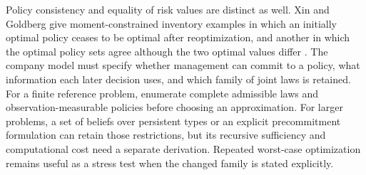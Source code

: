 Policy consistency and equality of risk values are distinct as well. Xin and
Goldberg give moment-constrained inventory examples in which an initially
optimal policy ceases to be optimal after reoptimization, and another in which
the optimal policy sets agree although the two optimal values differ
\cite[Definitions~3.1--3.3, Observations~5--7, proofs in Sections~6.3--6.5]{litclosexingoldberg}.
The company model must specify whether management can commit to a policy,
what information each later decision uses, and which family of joint laws is
retained. For a finite reference problem, enumerate complete admissible laws
and observation-measurable policies before choosing an approximation. For
larger problems, a set of beliefs over persistent types or an explicit
precommitment formulation can retain those restrictions, but its recursive
sufficiency and computational cost need a separate derivation. Repeated
worst-case optimization remains useful as a stress test when the changed
family is stated explicitly.
